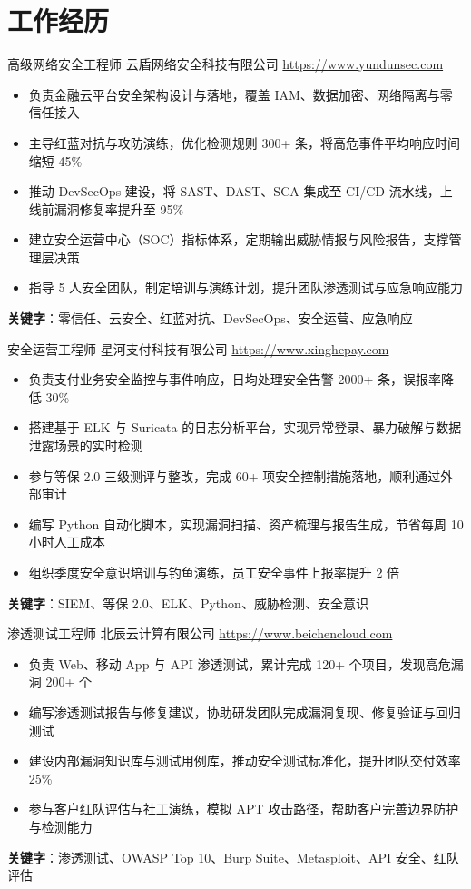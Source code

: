\documentclass[a4paper, serif, 10pt]{moderncv}
\begin{document}
\section{工作经历}

        {高级网络安全工程师}
        {云盾网络安全科技有限公司}
        {\url{https://www.yundunsec.com}}
        {}
        {\begin{itemize}
\item 负责金融云平台安全架构设计与落地，覆盖 IAM、数据加密、网络隔离与零信任接入
\item 主导红蓝对抗与攻防演练，优化检测规则 300+ 条，将高危事件平均响应时间缩短 45\%
\item 推动 DevSecOps 建设，将 SAST、DAST、SCA 集成至 CI/CD 流水线，上线前漏洞修复率提升至 95\%
\item 建立安全运营中心（SOC）指标体系，定期输出威胁情报与风险报告，支撑管理层决策
\item 指导 5 人安全团队，制定培训与演练计划，提升团队渗透测试与应急响应能力
\end{itemize}
\textbf{关键字}：零信任、云安全、红蓝对抗、DevSecOps、安全运营、应急响应}

        {安全运营工程师}
        {星河支付科技有限公司}
        {\url{https://www.xinghepay.com}}
        {}
        {\begin{itemize}
\item 负责支付业务安全监控与事件响应，日均处理安全告警 2000+ 条，误报率降低 30\%
\item 搭建基于 ELK 与 Suricata 的日志分析平台，实现异常登录、暴力破解与数据泄露场景的实时检测
\item 参与等保 2.0 三级测评与整改，完成 60+ 项安全控制措施落地，顺利通过外部审计
\item 编写 Python 自动化脚本，实现漏洞扫描、资产梳理与报告生成，节省每周 10 小时人工成本
\item 组织季度安全意识培训与钓鱼演练，员工安全事件上报率提升 2 倍
\end{itemize}
\textbf{关键字}：SIEM、等保 2.0、ELK、Python、威胁检测、安全意识}

        {渗透测试工程师}
        {北辰云计算有限公司}
        {\url{https://www.beichencloud.com}}
        {}
        {\begin{itemize}
\item 负责 Web、移动 App 与 API 渗透测试，累计完成 120+ 个项目，发现高危漏洞 200+ 个
\item 编写渗透测试报告与修复建议，协助研发团队完成漏洞复现、修复验证与回归测试
\item 建设内部漏洞知识库与测试用例库，推动安全测试标准化，提升团队交付效率 25\%
\item 参与客户红队评估与社工演练，模拟 APT 攻击路径，帮助客户完善边界防护与检测能力
\end{itemize}
\textbf{关键字}：渗透测试、OWASP Top 10、Burp Suite、Metasploit、API 安全、红队评估}
\end{document}
